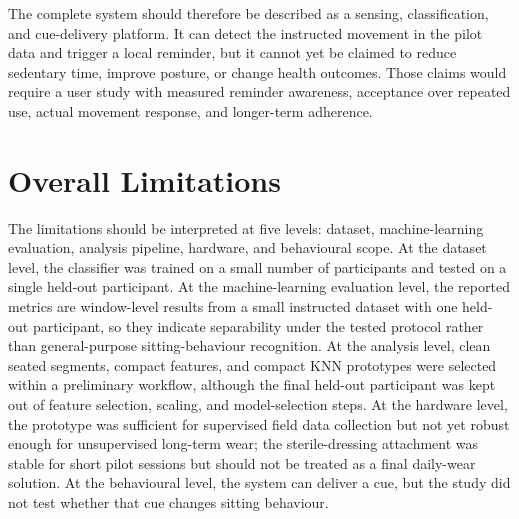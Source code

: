 The complete system should therefore be described as a sensing, classification, and cue-delivery platform. It can detect the instructed movement in the pilot data and trigger a local reminder, but it cannot yet be claimed to reduce sedentary time, improve posture, or change health outcomes. Those claims would require a user study with measured reminder awareness, acceptance over repeated use, actual movement response, and longer-term adherence.

\section{Overall Limitations}

The limitations should be interpreted at five levels: dataset, machine-learning evaluation, analysis pipeline, hardware, and behavioural scope. At the dataset level, the classifier was trained on a small number of participants and tested on a single held-out participant. At the machine-learning evaluation level, the reported metrics are window-level results from a small instructed dataset with one held-out participant, so they indicate separability under the tested protocol rather than general-purpose sitting-behaviour recognition. At the analysis level, clean seated segments, compact features, and compact KNN prototypes were selected within a preliminary workflow, although the final held-out participant was kept out of feature selection, scaling, and model-selection steps. At the hardware level, the prototype was sufficient for supervised field data collection but not yet robust enough for unsupervised long-term wear; the sterile-dressing attachment was stable for short pilot sessions but should not be treated as a final daily-wear solution. At the behavioural level, the system can deliver a cue, but the study did not test whether that cue changes sitting behaviour.

